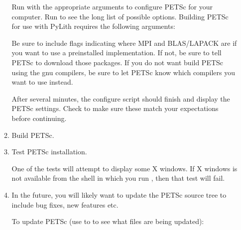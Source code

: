 \begin{enumerate}
\begin{enumerate}
    Run  with the appropriate arguments
    to configure PETSc for your computer. Run
     to see the long list of
    possible options. Building PETSc for use with PyLith requires the
    following arguments:

    \begin{screen}
    \end{screen}
    
    Be sure to include flags indicating where MPI and
    BLAS/LAPACK are if you want to use a preinstalled
    implementation. If not, be sure to tell PETSc to
    download those packages. If you do not want build
    PETSc using the gnu compilers, be sure to let PETSc
    know which compilers you want to use instead.

    After several minutes, the configure script should
    finish and display the PETSc settings. Check to make
    sure these match your expectations before continuing.

  \item Build PETSc.
    \begin{screen}
      \shellprompt{}
    \end{screen}
  \item Test PETSc installation.
    
    One of the tests will attempt to display some X windows. If X
    windows is not available from the shell in which you run
    , then that test will fail.

    \begin{screen}
      \shellprompt{}
    \end{screen}
    
  \item In the future, you will likely want to update the PETSc source
    tree to include bug fixes, new features etc.
    
    To update PETSc (use to  to see what files
    are being updated):

    \begin{screen}
      \shellprompt{}
      \shellprompt{}
      \shellprompt{}
      \shellprompt{}
      \shellprompt{}
      \shellprompt{}
    \end{screen}
  \end{enumerate}


\end{enumerate}
